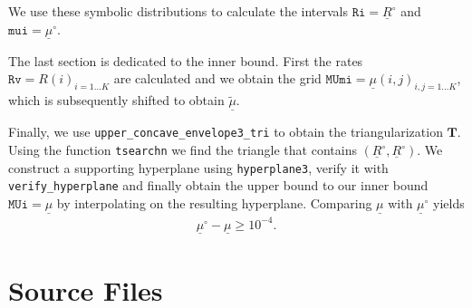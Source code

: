 \documentclass[a4paper,12pt]{scrartcl}
\newcommand{\ul}[1]{\ensuremath{\underline{#1}}}
\newcommand{\wt}[1]{\ensuremath{\widetilde{#1}}}
\newcommand{\mat}[1]{\ensuremath{\mathbf{#1}}}
\begin{document}


We use these symbolic distributions to calculate the intervals $\texttt{Ri} = \ul R^\circ$ and $\texttt{mui} = \ul \mu^\circ$.



The last section is dedicated to the inner bound. First the rates $\texttt{Rv} = R(i)_{i=1\dots K}$ are calculated and we obtain the grid $\texttt{MUmi} = \ul\mu(i,j)_{i,j=1\dots K}$, which is subsequently shifted to obtain $\ul{\wt{\mu}}$.



Finally, we use \texttt{upper\_concave\_envelope3\_tri} to obtain the triangularization $\mat T$. Using the function \texttt{tsearchn} we find the triangle that contains $(\ul R^\circ, \ul R^\circ)$. We construct a supporting hyperplane using \texttt{hyperplane3}, verify it with \texttt{verify\_hyperplane} and finally obtain the upper bound to our inner bound $\texttt{MUi} = \ul \mu$ by interpolating on the resulting hyperplane. Comparing $\ul \mu$ with $\ul \mu^\circ$ yields
\begin{align}
  \ul \mu^\circ - \ul \mu \ge 10^{-4} .
\end{align}



\section{Source Files}
\label{sec:source-files}
\end{document}
